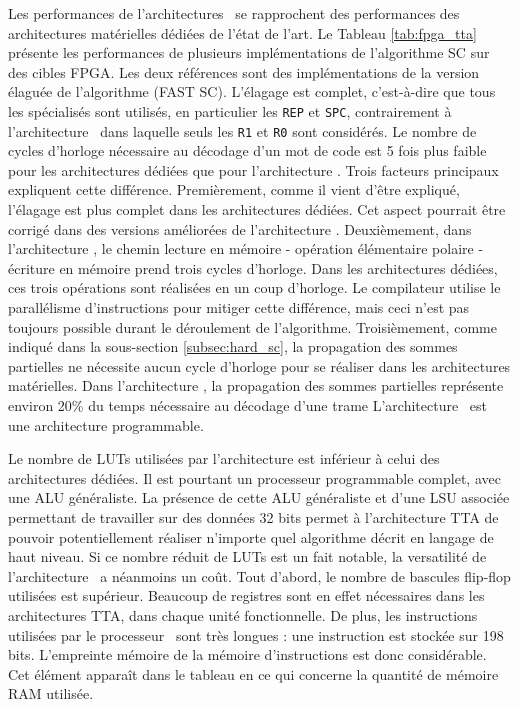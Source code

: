 Les performances de l'architectures \TTSC~se rapprochent des performances des architectures matérielles dédiées de l'état de l'art. Le Tableau \ref{tab:fpga_tta} présente les performances de plusieurs implémentations de l'algorithme SC sur des cibles FPGA. Les deux références \cite{sarkis_fast_2014,giard_638_2015}sont des implémentations de la version élaguée de l'algorithme (FAST SC). L'élagage est complet, c'est-à-dire que tous les \noeuds spécialisés sont utilisés, en particulier les \noeuds \texttt{REP} et \texttt{SPC}, contrairement à l'architecture \TTSC~dans laquelle seuls les \noeuds \texttt{R1} et \texttt{R0} sont considérés. Le nombre de cycles d'horloge nécessaire au décodage d'un mot de code est 5 fois plus faible pour les architectures dédiées que pour l'architecture \TTSC. Trois facteurs principaux expliquent cette différence. Premièrement, comme il vient d'être expliqué, l'élagage est plus complet dans les architectures dédiées. Cet aspect pourrait être corrigé dans des versions améliorées de l'architecture \TTSC. Deuxièmement, dans l'architecture \TTSC, le chemin lecture en mémoire - opération élémentaire polaire - écriture en mémoire prend trois cycles d'horloge. Dans les architectures dédiées, ces trois opérations sont réalisées en un coup d'horloge. Le compilateur utilise le parallélisme d'instructions pour mitiger cette différence, mais ceci n'est pas toujours possible durant le déroulement de l'algorithme. Troisièmement, comme indiqué dans la sous-section \ref{subsec:hard_sc}, la propagation des sommes partielles ne nécessite aucun cycle d'horloge pour se réaliser dans les architectures matérielles. Dans l'architecture \TTSC, la propagation des sommes partielles représente environ 20\% du temps nécessaire au décodage d'une trame
L'architecture \TTSC~est une architecture programmable. 


Le nombre de LUTs utilisées par l'architecture \TTSC est inférieur à celui des architectures dédiées. Il est pourtant un processeur programmable complet, avec une ALU généraliste. La présence de cette ALU généraliste et d'une LSU associée permettant de travailler sur des données 32 bits permet à l'architecture TTA de pouvoir potentiellement réaliser n'importe quel algorithme décrit en langage de haut niveau. Si ce nombre réduit de LUTs est un fait notable, la versatilité de l'architecture \TTSC~a néanmoins un coût. Tout d'abord, le nombre de bascules flip-flop utilisées est supérieur. Beaucoup de registres sont en effet nécessaires dans les architectures TTA, dans chaque unité fonctionnelle. De plus, les instructions utilisées par le processeur \TTSC~sont très longues : une instruction est stockée sur 198 bits. L'empreinte mémoire de la mémoire d'instructions est donc considérable. Cet élément apparaît dans le tableau en ce qui concerne la quantité de mémoire RAM utilisée.




